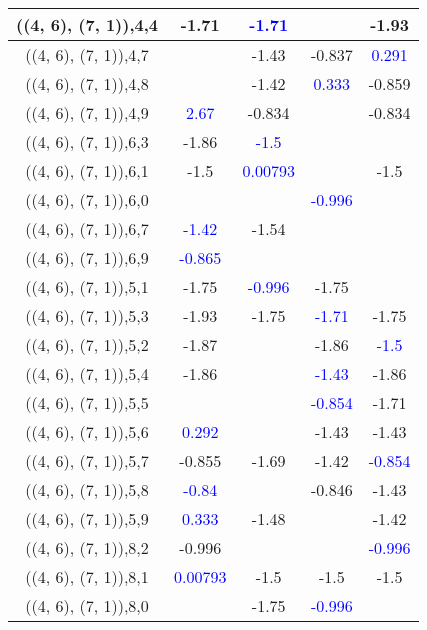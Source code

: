 \documentclass{article}
\begin{document}
\begin{center}
\begin{longtable}{|c|c|c|c|c|}
        	\hline
        	((4, 6), (7, 1)),4,4&-1.71& \textcolor{blue}{-1.71}&&-1.93\\
        	\hline
        	((4, 6), (7, 1)),4,7&&-1.43&-0.837& \textcolor{blue}{0.291}\\
        	\hline
        	((4, 6), (7, 1)),4,8&&-1.42& \textcolor{blue}{0.333}&-0.859\\
        	\hline
        	((4, 6), (7, 1)),4,9& \textcolor{blue}{2.67}&-0.834&&-0.834\\
        	\hline
        	((4, 6), (7, 1)),6,3&-1.86& \textcolor{blue}{-1.5}&&\\
        	\hline
        	((4, 6), (7, 1)),6,1&-1.5& \textcolor{blue}{0.00793}&&-1.5\\
        	\hline
        	((4, 6), (7, 1)),6,0&&& \textcolor{blue}{-0.996}&\\
        	\hline
        	((4, 6), (7, 1)),6,7& \textcolor{blue}{-1.42}&-1.54&&\\
        	\hline
        	((4, 6), (7, 1)),6,9& \textcolor{blue}{-0.865}&&&\\
        	\hline
        	((4, 6), (7, 1)),5,1&-1.75& \textcolor{blue}{-0.996}&-1.75&\\
        	\hline
        	((4, 6), (7, 1)),5,3&-1.93&-1.75& \textcolor{blue}{-1.71}&-1.75\\
        	\hline
        	((4, 6), (7, 1)),5,2&-1.87&&-1.86& \textcolor{blue}{-1.5}\\
        	\hline
        	((4, 6), (7, 1)),5,4&-1.86&& \textcolor{blue}{-1.43}&-1.86\\
        	\hline
        	((4, 6), (7, 1)),5,5&&& \textcolor{blue}{-0.854}&-1.71\\
        	\hline
        	((4, 6), (7, 1)),5,6& \textcolor{blue}{0.292}&&-1.43&-1.43\\
        	\hline
        	((4, 6), (7, 1)),5,7&-0.855&-1.69&-1.42& \textcolor{blue}{-0.854}\\
        	\hline
        	((4, 6), (7, 1)),5,8& \textcolor{blue}{-0.84}&&-0.846&-1.43\\
        	\hline
        	((4, 6), (7, 1)),5,9& \textcolor{blue}{0.333}&-1.48&&-1.42\\
        	\hline
        	((4, 6), (7, 1)),8,2&-0.996&&& \textcolor{blue}{-0.996}\\
        	\hline
        	((4, 6), (7, 1)),8,1& \textcolor{blue}{0.00793}&-1.5&-1.5&-1.5\\
        	\hline
        	((4, 6), (7, 1)),8,0&&-1.75& \textcolor{blue}{-0.996}&\\

\end{longtable}
\end{center}
\end{document}
